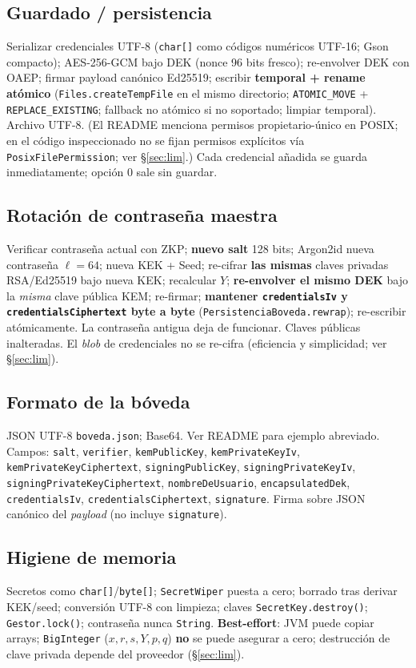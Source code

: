 \documentclass[11pt,a4paper]{article}
\begin{document}
\subsection{Guardado / persistencia}
Serializar credenciales UTF-8 (\texttt{char[]} como códigos numéricos UTF-16;
Gson compacto); AES-256-GCM bajo DEK (nonce 96 bits fresco); re-envolver DEK con
OAEP; firmar payload canónico Ed25519; escribir \textbf{temporal + rename atómico}
(\texttt{Files.createTempFile} en el mismo directorio; \texttt{ATOMIC\_MOVE} +
\texttt{REPLACE\_EXISTING}; fallback no atómico si no soportado; limpiar temporal).
Archivo UTF-8. (El README menciona permisos propietario-único en POSIX; en el
código inspeccionado no se fijan permisos explícitos vía
\texttt{PosixFilePermission}; ver §\ref{sec:lim}.)
Cada credencial añadida se guarda inmediatamente; opción 0 sale sin guardar.

\subsection{Rotación de contraseña maestra}\label{sec:rot}
Verificar contraseña actual con ZKP; \textbf{nuevo salt} 128 bits; Argon2id
nueva contraseña $\ell=64$; nueva KEK + Seed; re-cifrar \textbf{las mismas} claves
privadas RSA/Ed25519 bajo nueva KEK; recalcular $Y$; \textbf{re-envolver el mismo
DEK} bajo la \emph{misma} clave pública KEM; re-firmar; \textbf{mantener
\texttt{credentialsIv} y \texttt{credentialsCiphertext} byte a byte}
(\texttt{PersistenciaBoveda.rewrap}); re-escribir atómicamente. La contraseña
antigua deja de funcionar. Claves públicas inalteradas. El \emph{blob} de credenciales
no se re-cifra (eficiencia y simplicidad; ver §\ref{sec:lim}).

\subsection{Formato de la bóveda}
JSON UTF-8 \texttt{boveda.json}; Base64. Ver README para ejemplo abreviado. Campos:
\texttt{salt}, \texttt{verifier}, \texttt{kemPublicKey}, \texttt{kemPrivateKeyIv},
\texttt{kemPrivateKeyCiphertext}, \texttt{signingPublicKey},
\texttt{signingPrivateKeyIv}, \texttt{signingPrivateKeyCiphertext},
\texttt{nombreDeUsuario}, \texttt{encapsulatedDek}, \texttt{credentialsIv},
\texttt{credentialsCiphertext}, \texttt{signature}. Firma sobre JSON canónico del
\emph{payload} (no incluye \texttt{signature}).

\subsection{Higiene de memoria}
Secretos como \texttt{char[]}/\texttt{byte[]}; \texttt{SecretWiper} puesta a cero;
borrado tras derivar KEK/seed; conversión UTF-8 con limpieza; claves
\texttt{SecretKey.destroy()}; \texttt{Gestor.lock()}; contraseña nunca \texttt{String}.
\textbf{Best-effort}: JVM puede copiar arrays; \texttt{BigInteger} ($x, r, s, Y, p, q$)
\textbf{no} se puede asegurar a cero; destrucción de clave privada depende del
proveedor (§\ref{sec:lim}).
\end{document}
